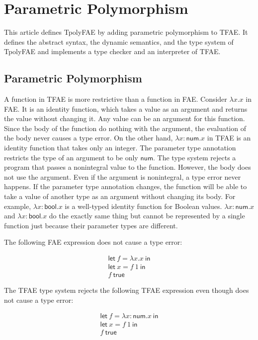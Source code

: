\setchapterpreamble[u]{\margintoc}
\chapter{Parametric Polymorphism}

This article defines TpolyFAE by adding parametric polymorphism to TFAE. It
defines the abstract syntax, the dynamic semantics, and the type system of
TpolyFAE and implements a type checker and an interpreter of TFAE.

\section{Parametric Polymorphism}

A function in TFAE is more restrictive than a function in FAE. Consider
$\lambda x.x$ in FAE. It is an identity function, which takes a value as an
argument and returns the value without changing it. Any value can be an argument
for this function. Since the body of the function do nothing with the argument,
the evaluation of the body never causes a type error. On the other hand,
$\lambda x:\textsf{num}.x$ in TFAE is an identity function that takes only an
integer. The parameter type annotation restricts the type of an argument to be
only $\textsf{num}$. The type system rejects a program that passes a nonintegral
value to the function. However, the body does not use the argument. Even if
the argument is nonintegral, a type error never happens. If the parameter type
annotation changes, the function will be able to take a value of another type
as an argument without changing its body. For example, \(\lambda x:\textsf{
bool}.x\) is a well-typed identity function for Boolean values. \(\lambda
x:\textsf{num}.x\) and $\lambda x:\textsf{bool}.x$ do the exactly same thing but
cannot be represented by a single function just because their parameter types
are different.

The following FAE expression does not cause a type error:

\[
\begin{array}{l}
\textsf{let}\ f=\lambda x.x\ \textsf{in} \\
\textsf{let}\ x=f\ 1\ \textsf{in} \\
f\ \textsf{true}
\end{array}
\]

The TFAE type system rejects the following TFAE expression even though does
not cause a type error:

\[
\begin{array}{l}
\textsf{let}\ f=\lambda x:\textsf{num}.x\ \textsf{in} \\
\textsf{let}\ x=f\ 1\ \textsf{in} \\
f\ \textsf{true}
\end{array}
\]


